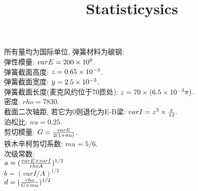 \documentclass[UTF8,9pt]{ctexart}
\title{Statisticysics}
\begin{document}
 
所有量均为国际单位, 弹簧材料为碳钢:\\
弹性模量: $varE=200\times 10^{9}$.\\
弹簧截面高度: $z=0.65\times 10^{-3}$.\\
弹簧截面宽度: $y=2.5\times 10^{-3}$.\\
弹簧截面长度(麦克风约位于70匝处): $z=70\times(6.5\times 10^{-3}\pi)$.\\
密度: $rho=7830$.\\
截面二次轴距, 若它为0则退化为E-B梁: $varI=z^3\times\frac{x}{12}.$\\
泊松比: $nu=0.25$.\\
剪切模量: $G=\frac{varE}{2(1+nu)}$.\\
铁木辛柯剪切系数: $mu=5/6$.\\
次级常数: \\
$a = (\frac{varE\times varI}{rho A})^{1/2}$\\
$b = (varI/A)^{1/2}$\\ 
$d = (\frac{rho}{G\times mu})^{1/2}$
\end{document}
